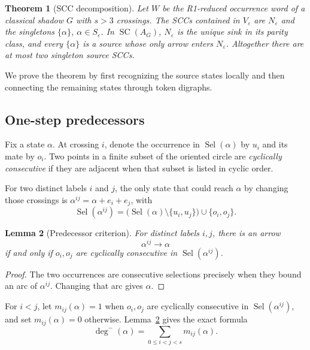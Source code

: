 \documentclass[11pt]{amsart}
\newtheorem{theorem}{Theorem}[section]
\newtheorem{lemma}[theorem]{Lemma}
\theoremstyle{definition}
\theoremstyle{remark}
\begin{document}
\begin{theorem}[SCC decomposition]\label{thm:strong}
Let \(W\) be the R1-reduced occurrence word of a classical shadow \(G\) with
\(s>3\) crossings.  The SCCs contained in \(V_\varepsilon\) are
\(N_\varepsilon\) and the singletons \(\{\alpha\}\),
\(\alpha\in S_\varepsilon\).  In $\operatorname{SC}(A_G)$,
\(N_\varepsilon\) is the unique sink in its parity class, and every
\(\{\alpha\}\) is a source whose only  arrow enters
\(N_\varepsilon\).  Altogether there are at most two singleton source SCCs.
\end{theorem}

We prove the theorem by first recognizing the source states locally and then
connecting the remaining states through token digraphs.

\subsection{One-step predecessors}

Fix a state \(\alpha\).  At crossing \(i\), denote the occurrence in
\(\operatorname{Sel}(\alpha)\) by \(u_i\) and its mate by \(o_i\).
Two points in a finite subset of the oriented circle are \emph{cyclically
consecutive} if they are adjacent when that subset is listed in cyclic order.

For two distinct labels \(i\) and \(j\), the only state that could reach \(\alpha\)
by changing those crossings is \(\alpha^{ij}=\alpha+e_i+e_j\), with
\begin{equation}\label{eq:candidate-set}
  \operatorname{Sel}(\alpha^{ij})
  =\bigl(\operatorname{Sel}(\alpha)\setminus\{u_i,u_j\}\bigr)
   \cup\{o_i,o_j\}.
\end{equation}

\begin{lemma}[Predecessor criterion]\label{lem:predecessor}
For distinct labels \(i,j\), there is an arrow
\[
  \alpha^{ij}\longrightarrow\alpha
\]
if and only if \(o_i,o_j\) are cyclically consecutive in
\(\operatorname{Sel}(\alpha^{ij})\).
\end{lemma}

\begin{proof}
The two occurrences are consecutive selections precisely when they bound an
arc of \(\alpha^{ij}\). Changing that arc gives \(\alpha\).
\end{proof}

For \(i<j\), let \(m_{ij}(\alpha)=1\) when \(o_i,o_j\) are cyclically
consecutive in \(\operatorname{Sel}(\alpha^{ij})\), and set
\(m_{ij}(\alpha)=0\) otherwise.
Lemma~\ref{lem:predecessor} gives the exact formula
\begin{equation}\label{eq:indegree}
  \deg^-(\alpha)=\sum_{0\le i<j<s}m_{ij}(\alpha).
\end{equation}
\end{document}
